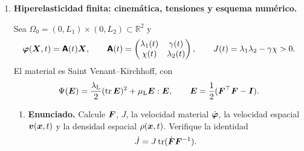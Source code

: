 \documentclass[11pt]{article}
\def\vec   #1{\mbox{\boldmath $#1$}{}}
\def\ten   #1{\mbox{\boldmath $#1$}{}}
\def\mat   #1{\mbox{\boldmath $\mathsf #1$}}
\def\R{\mathbb R}
\DeclareMathOperator{\tr}{tr}
\begin{document}
\begin{enumerate}[label=\textbf{\arabic*.}, leftmargin=*]

\item \textbf{Hiperelasticidad finita: cinemática, tensiones y esquema numérico.}

Sea $\Omega_0=(0,L_1)\times(0,L_2)\subset\R^2$ y
\[
    \vec\varphi(\vec X,t)=\mat A(t)\vec X,
    \qquad
    \mat A(t)=
    \begin{pmatrix}
        \lambda_1(t)&\gamma(t)\\
        \chi(t)&\lambda_2(t)
    \end{pmatrix},
    \qquad
    J(t)=\lambda_1\lambda_2-\gamma\chi>0.
\]
El material es Saint Venant--Kirchhoff, con
\[
    \Psi(\ten E)=\frac{\lambda_{\mathrm L}}2(\tr\ten E)^2+
    \mu_{\mathrm L}\ten E:\ten E,
    \qquad
    \ten E=\frac12(\ten F^\top\ten F-\ten I).
\]

\begin{enumerate}[label=(\alph*), leftmargin=*]
    \item \textbf{Enunciado.} Calcule $\ten F$, $J$, la velocidad material $\dot{\vec\varphi}$, la velocidad espacial $\vec v(\vec x,t)$ y la densidad espacial $\rho(\vec x,t)$. Verifique la identidad
    \[
        \dot J=J\tr(\dot{\ten F}\ten F^{-1}).
    \]


\end{enumerate}
\end{enumerate}
\end{document}
